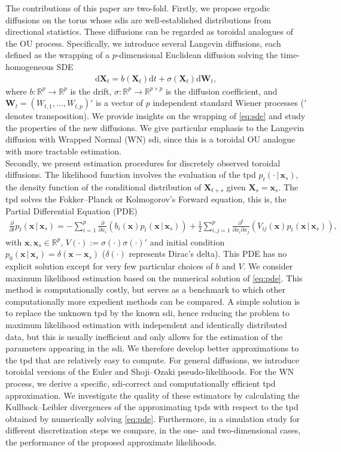 \documentclass[oneside,11pt]{article}
\newcommand{\R}{\mathbb{R}}
\newcommand{\rd}{\mathrm{d}}
\newcommand{\bx}{\mathbf{x}}
\newcommand{\bX}{\mathbf{X}}
\newcommand{\bW}{\mathbf{W}}
\newcommand{\pf}[2]{\frac{\partial #1}{\partial #2}}
\begin{document}
The contributions of this paper are two-fold. Firstly, we propose
ergodic diffusions on the torus whose sdis are well-established
distributions from directional statistics. These diffusions can be regarded as
toroidal analogues of the OU process. Specifically, we
introduce several Langevin diffusions, each defined as the wrapping of a $p$-dimensional Euclidean diffusion solving the time-homogeneous SDE
\begin{align}
\rd \bX_t=b(\bX_t)\rd t+\sigma(\bX_t)\rd\bW_t, \label{eq:sde}
\end{align}
where $b:\R^{p}\rightarrow\R^{p}$ is the drift, $\sigma:\R^{p}\rightarrow\R^{p\times p}$ is the diffusion coefficient, and $\bW_t=(W_{t,1},\ldots,W_{t,p})'$ is a vector of $p$ independent standard Wiener processes ($'$ denotes transposition). We provide insights on the wrapping of \eqref{eq:sde} and study the properties of the new diffusions. We give particular emphasis to the Langevin diffusion with Wrapped Normal (WN) sdi, since this is a toroidal OU analogue with more tractable estimation. \\

Secondly, we present estimation procedures for discretely observed
toroidal diffusions. The likelihood function involves the evaluation of the tpd
$p_t(\cdot\, | \,\bx_s)$, the density function of the conditional
distribution of $\bX_{t+s}$ given $\bX_s=\bx_s$. The tpd solves the
Fokker--Planck or Kolmogorov's Forward equation, this is, the Partial Differential Equation (PDE)
\begin{align}
\pf{}{t} p_t(\bx\, | \,\bx_s)=-\sum_{i=1}^p\frac{\partial}{\partial
  x_i} (b_i(\bx)p_t(\bx\,|\,\bx_s)) +\frac{1}{2}\sum_{i,j=1}^p\frac{\partial^2}{\partial x_i\partial x_j}
  (V_{ij}(\bx)p_t(\bx\, | \,\bx_s)), \label{eq:pde}
\end{align}
with $\bx,\bx_s\in\R^p$, $V(\cdot):=\sigma(\cdot)\sigma(\cdot)'$ and initial condition $p_0(\bx\, | \,\bx_s)=\delta(\bx-\bx_s)$ ($\delta(\cdot)$ represents Dirac's delta). This PDE has no explicit solution except for very few particular choices
of $b$ and $V$.  We consider
maximum likelihood estimation based on the numerical solution of \eqref{eq:pde}. This method is computationally costly, but serves as a benchmark to which other computationally more expedient methods can
be compared. A simple solution is to replace the unknown tpd by the
known sdi, hence reducing the problem to
maximum likelihood estimation with independent and identically distributed data, but this is usually inefficient and only allows for the estimation of the parameters appearing in the sdi. We
therefore develop better approximations to the tpd that are relatively
easy to compute. For general diffusions, we introduce toroidal versions of the
Euler and Shoji--Ozaki pseudo-likelihoods. For the WN process, we derive a specific, sdi-correct and
computationally efficient tpd approximation. We investigate the quality of these estimators by calculating
the Kullback--Leibler divergences of the approximating tpds with
respect to the tpd obtained by numerically solving \eqref{eq:pde}. Furthermore, in a simulation study for different discretization steps we compare, in the one- and two-dimensional cases,
the performance of the proposed approximate likelihoods. \\
\end{document}
